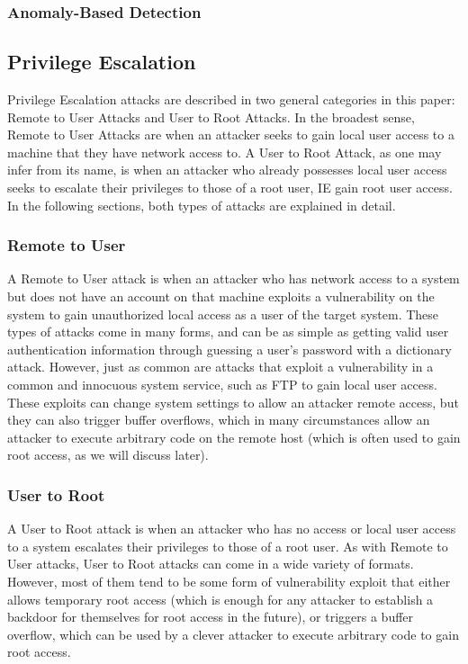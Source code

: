 \documentclass{acm_proc_article-sp}
\begin{document}
		\subsubsection{Anomaly-Based Detection}
		
    
    \subsection{Privilege Escalation} %
    Privilege Escalation attacks are described in two general categories in this paper: Remote to User Attacks and User to Root Attacks. In the broadest sense, Remote to User Attacks are when an attacker seeks to gain local user access to a machine that they have network access to. A User to Root Attack, as one may infer from its name, is when an attacker who already possesses local user access seeks to escalate their privileges to those of a root user, IE gain root user access. In the following sections, both types of attacks are explained in detail.
    \subsubsection{Remote to User}
    A Remote to User attack is when an attacker who has network access to a system but does not have an account on that machine exploits a vulnerability on the system to gain unauthorized local access as a user of the target system. These types of attacks come in many forms, and can be as simple as getting valid user authentication information through guessing a user's password with a dictionary attack. However, just as common are attacks that exploit a vulnerability in a common and innocuous system service, such as FTP to gain local user access. These exploits can change system settings to allow an attacker remote access, but they can also trigger buffer overflows, which in many circumstances allow an attacker to execute arbitrary code on the remote host (which is often used to gain root access, as we will discuss later). 
    \subsubsection{User to Root}
     A User to Root attack is when an attacker who has no access or local user access to a system escalates their privileges to those of a root user. As with Remote to User attacks, User to Root attacks can come in a wide variety of formats. However, most of them tend to be some form of vulnerability exploit that either allows temporary root access (which is enough for any attacker to establish a backdoor for themselves for root access in the future), or triggers a buffer overflow, which can be used by a clever attacker to execute arbitrary code to gain root access. 
\end{document}

